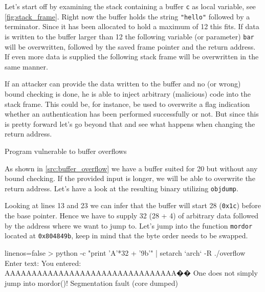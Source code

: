 \documentclass[article]{uibk}
\begin{document}
Let's start off by examining the stack containing a buffer \texttt{c} as local
variable, see \cref{fig:stack_frame}. Right now the buffer holds the string
\texttt{"hello"} followed by a terminator. Since it has been allocated
to hold a maximum of \SI{12}{\byte} this fits. If data is written to the buffer
larger than \SI{12}{\byte} the following variable (or parameter) \texttt{bar}
will be overwritten, followed by the saved frame pointer and the return
address. If even more data is supplied the following stack frame will be
overwritten in the same manner.

If an attacker can provide the data written to the buffer and no (or wrong)
bound checking is done, he is able to inject arbitrary (malicious) code into
the stack frame. This could be, for instance, be used to overwrite a flag
indication whether an authentication has been performed successfully or not.
But since this is pretty forward let's go beyond that and see what happens when
changing the return address.

\begin{listing}[h!]
    \begin{minipage}[t]{0.37\textwidth}
    \end{minipage}\hfill
    \begin{minipage}[t]{0.63\textwidth}
    \end{minipage}
    \caption{Program vulnerable to buffer overflows}
    \label{src:buffer_overflow}
\end{listing}

As shown in \cref{src:buffer_overflow} we have a buffer suited for
\SI{20}{\byte} but without any bound checking. If the provided input is longer,
we will be able to overwrite the return address. Let's have a look at the
resulting binary utilizing \texttt{objdump}.

Looking at lines 13 and 23 we can infer that the buffer will start
\SI{28}{\byte} (\texttt{0x1c}) before the base pointer. Hence we have to supply
\SI{32}{\byte} (28 + 4) of arbitrary data followed by the address where we want
to jump to. Let's jump into the function \texttt{mordor} located at
\texttt{0x804849b}, keep in mind that the byte order needs to be swapped.

\begin{code*}{linenos=false}
> python -c "print 'A'*32 + '\x9b'" | setarch `arch` -R ./overflow
Enter text:
You entered: AAAAAAAAAAAAAAAAAAAAAAAAAAAAAAAA��
One does not simply jump into mordor()!
Segmentation fault (core dumped)
\end{code*}
\end{document}
